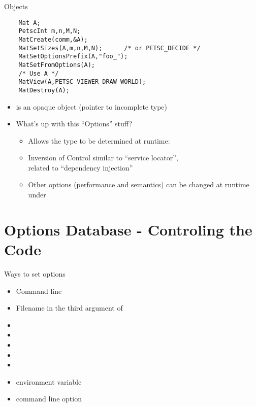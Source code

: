 
\begin{frame}[fragile]{Objects}
  \begin{verbatim}
    Mat A;
    PetscInt m,n,M,N;
    MatCreate(comm,&A);
    MatSetSizes(A,m,n,M,N);      /* or PETSC_DECIDE */
    MatSetOptionsPrefix(A,"foo_");
    MatSetFromOptions(A);
    /* Use A */
    MatView(A,PETSC_VIEWER_DRAW_WORLD);
    MatDestroy(A);
  \end{verbatim}
  \begin{itemize}
  \item {} is an opaque object (pointer to incomplete type)
  \item What's up with this ``Options'' stuff?
    \begin{itemize}
    \item Allows the type to be determined at runtime: 
    \item Inversion of Control similar to ``service locator'', \\
      related to ``dependency injection''
    \item Other options (performance and semantics) can be changed at
      runtime under 
    \end{itemize}
  \end{itemize}
\end{frame}



\section{Options Database - Controling the Code}
\begin{frame}{Ways to set options}
  \begin{itemize}
  \item Command line
  \item Filename in the third argument of 
  \item {}
  \item {}
  \item {}
  \item {}
  \item {}
  \item {} environment variable
  \item command line option 
  \end{itemize}
\end{frame}

